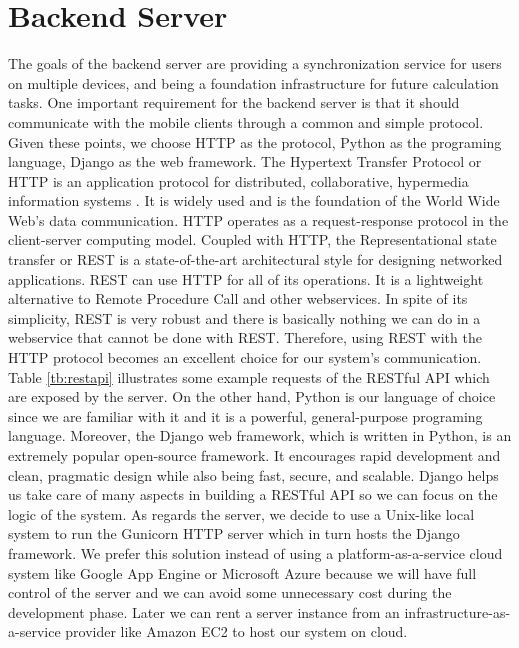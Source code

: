 \section{Backend Server}
The goals of the backend server are providing a synchronization service for users on multiple devices, and being a foundation infrastructure for future calculation tasks. One important requirement for the backend server is that it should communicate with the mobile clients through a common and simple protocol. Given these points, we choose HTTP as the protocol, Python as the programing language, Django as the web framework. The Hypertext Transfer Protocol or HTTP is an application protocol for distributed, collaborative, hypermedia information systems \cite{leach1999hypertext}. It is widely used and is the foundation of the World Wide Web's data communication. HTTP operates as a request-response protocol in the client-server computing model. Coupled with HTTP, the Representational state transfer or REST is a state-of-the-art architectural style for designing networked applications. REST can use HTTP for all of its operations. It is a lightweight alternative to Remote Procedure Call and other webservices. In spite of its simplicity, REST is very robust and there is basically nothing we can do in a webservice that cannot be done with REST. Therefore, using REST with the HTTP protocol becomes an excellent choice for our system's communication. Table \ref{tb:restapi} illustrates some example requests of the RESTful API which are exposed by the server. On the other hand, Python is our language of choice since we are familiar with it and it is a powerful, general-purpose programing language. Moreover, the Django web framework, which is written in Python, is an extremely popular open-source framework. It encourages rapid development and clean, pragmatic design while also being fast, secure, and scalable. Django helps us take care of many aspects in building a RESTful API so we can focus on the logic of the system. As regards the server, we decide to use a Unix-like local system to run the Gunicorn HTTP server which in turn hosts the Django framework. We prefer this solution instead of using a platform-as-a-service cloud system like Google App Engine or Microsoft Azure because we will have full control of the server and we can avoid some unnecessary cost during the development phase. Later we can rent a server instance from an infrastructure-as-a-service provider like Amazon EC2 to host our system on cloud.

